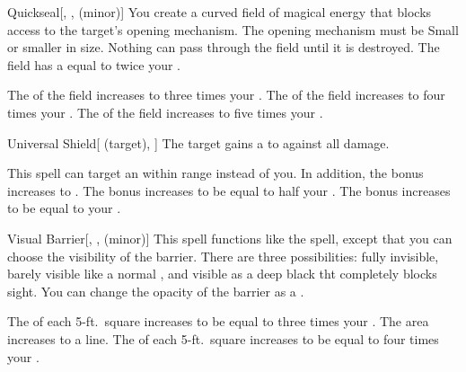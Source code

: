 \lowercase{\hypertarget{spell:Quickseal}{}}\label{spell:Quickseal}
\begin{freeability}[Rank 2]{\hypertarget{spell:Quickseal}{Quickseal}}[, ,  (minor)]
You create a curved field of magical energy that blocks access to the target's opening mechanism.
The opening mechanism must be Small or smaller in size.
Nothing can pass through the field until it is destroyed.
The field has a  equal to twice your .

\rankline
{} The  of the field increases to three times your .
 The  of the field increases to four times your .
 The  of the field increases to five times your .

\end{freeability}
\vspace{0.25em}



\lowercase{\hypertarget{spell:Universal Shield}{}}\label{spell:Universal Shield}
\begin{attuneability}[Rank 2]{\hypertarget{spell:Universal Shield}{Universal Shield}}[ (target), ]
The target gains a   to  against all damage.

\rankline
{} This spell can target an  within \rngmed range instead of you.
In addition, the bonus increases to .
 The bonus increases to be equal to half your .
 The bonus increases to be equal to your .

\end{attuneability}
\vspace{0.25em}



\lowercase{\hypertarget{spell:Visual Barrier}{}}\label{spell:Visual Barrier}
\begin{freeability}[Rank 2]{\hypertarget{spell:Visual Barrier}{Visual Barrier}}[, ,  (minor)]
\targetrule
This spell functions like the  spell, except that you can choose the visibility of the barrier.
There are three possibilities: fully invisible, barely visible like a normal , and visible as a deep black tht completely blocks sight.
You can change the opacity of the barrier as a .

\rankline
{} The  of each 5-ft.\ square increases to be equal to three times your .
 The area increases to a \arealarge line.
 The  of each 5-ft.\ square increases to be equal to four times your .

\end{freeability}
\vspace{0.25em}



